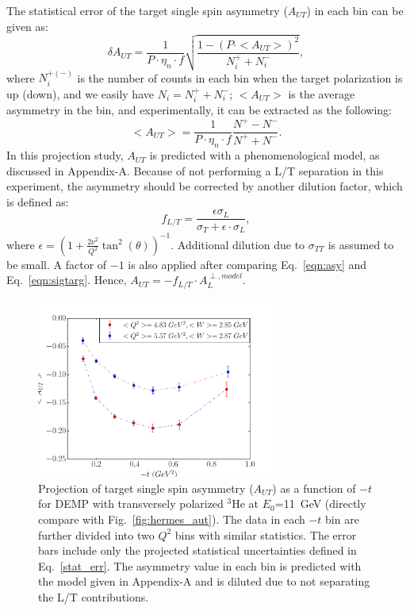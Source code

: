 The statistical error of the target single spin asymmetry ($A_{UT}$) in each
bin can be given as:
  \begin{equation}
    \delta A_{UT} = \frac{1}{P\cdot\eta_{n}\cdot f} \sqrt{\frac{1-(P\cdot
        <A_{UT}>)^{2}}{N^{+}_{i}+N^{-}_{i}}},
    \label{stat_err}
 \end{equation}
where $N^{+(-)}_{i}$ is the number of counts in each bin when the target
polarization is up (down), and we easily have $N_{i}=N^{+}_{i}+N^{-}_{i}$;
$<A_{UT}>$ is the average asymmetry in the bin, and experimentally, it can be
extracted as the following:
\begin{equation}
   <A_{UT}> = \frac{1}{P\cdot\eta_{n}\cdot f} \frac{N^{+}-N^{-}}{N^{+}+N^{-}}.
   \label{asym_exp}
\end{equation}
In this projection study, $A_{UT}$ is predicted with a phenomenological model,
as discussed in Appendix-A. Because of not performing a L/T separation in this
experiment, the asymmetry should be corrected by another dilution factor, which
is defined as:
\begin{equation}
  f_{L/T} =\frac{\epsilon\sigma_{L} }{\sigma_{T}+\epsilon\cdot\sigma_{L} },
\end{equation} 
where $\epsilon=(1+\frac{2\nu^{2}}{Q^{2}}\tan^{2}(\theta))^{-1}$. Additional
dilution due to $\sigma_{TT}$ is assumed to be small.  A factor of $-1$ is also
applied after comparing Eq.~\ref{eqn:asy} and Eq.~\ref{eqn:sigtarg}. Hence,
$A_{UT} = -f_{L/T}\cdot A_{L}^{\perp,model}$.

\begin{figure}[!ht]
 \begin{center}
               \includegraphics[type=pdf,
        ext=.pdf,read=.pdf,width=0.7\textwidth]{./figures/bin_asym_t_11m_fermi} 
      
      \caption{\footnotesize{Projection of target single spin asymmetry
          ($A_{UT}$) as a function of $-t$ for DEMP with transversely polarized
          $\mathrm{^{3}He}$ at $E_{0}$=11~GeV (directly compare with
Fig.~\ref{fig:hermes_aut}).  The data in each $-t$ bin are further divided into
two $Q^{2}$ bins with similar statistics.  The error bars include only the projected
statistical uncertainties defined in Eq.~\ref{stat_err}. The asymmetry value in
each bin is predicted with the model given in Appendix-A and is diluted due to
not separating the L/T contributions. }}
  \label{asym_t}
  \end{center}
\end{figure}

